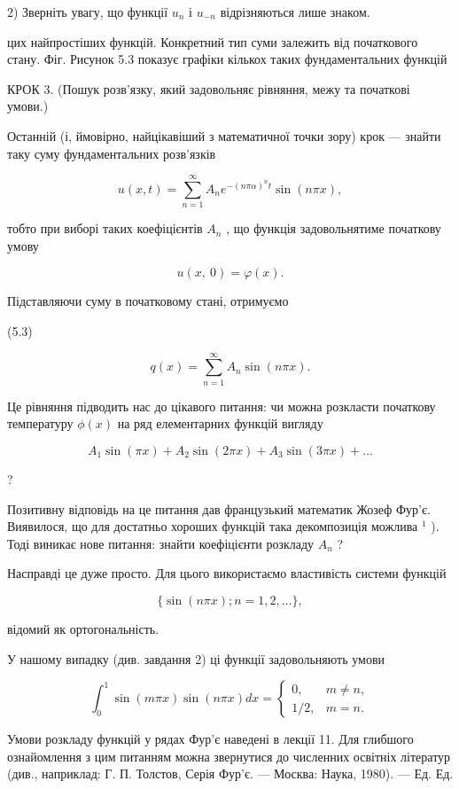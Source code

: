 \documentclass[
  ukrainian,
]{article}
\begin{document}
2) Зверніть увагу, що функції \(u_n\) і \(u_{-n}\) відрізняються лише
знаком.

цих найпростіших функцій. Конкретний тип суми залежить від початкового
стану. Фіг. Рисунок 5.3 показує графіки кількох таких фундаментальних
функцій

КРОК 3. (Пошук розв'язку, який задовольняє рівняння, межу та початкові
умови.)

Останній (і, ймовірно, найцікавіший з математичної точки зору) крок ---
знайти таку суму фундаментальних розв'язків

\[
u(x, t) = \sum_{n=1}^{\infty} A_n e^{-(n\pi\alpha)^n t} \sin(n\pi x),
\]

тобто при виборі таких коефіцієнтів \(A_n\) , що функція задовольнятиме
початкову умову

\[
u\left( x,\ 0\right) =\varphi\left( x\right) .
\]

Підставляючи суму в початковому стані, отримуємо

(5.3)

\[
q(x) = \sum_{n=1}^{\infty} A_n \sin(n\pi x).
\]

Це рівняння підводить нас до цікавого питання: чи можна розкласти
початкову температуру \(\phi(x)\) на ряд елементарних функцій вигляду

\[
A_1 \sin(\pi x) + A_2 \sin(2\pi x) + A_3 \sin(3\pi x) + \dots
\]

?

Позитивну відповідь на це питання дав французький математик Жозеф Фур'є.
Виявилося, що для достатньо хороших функцій така декомпозиція можлива
\(^1\) ). Тоді виникає нове питання: знайти коефіцієнти розкладу \(A_n\)
?

Насправді це дуже просто. Для цього використаємо властивість системи
функцій

\[
\{\sin(n\pi x); n=1, 2, \ldots\},
\]

відомий як ортогональність.

У нашому випадку (див. завдання 2) ці функції задовольняють умови

\[
\int_{0}^{1} \sin(m\pi x) \sin(n\pi x) dx = \begin{cases} 0, & m \neq n, \\ 1/2, & m = n. \end{cases}
\]

Умови розкладу функцій у рядах Фур'є наведені в лекції 11. Для глибшого
ознайомлення з цим питанням можна звернутися до численних освітніх
літератур (див., наприклад: Г. П. Толстов, Серія Фур'є. --- Москва:
Наука, 1980). --- Ед. Ед.
\end{document}
